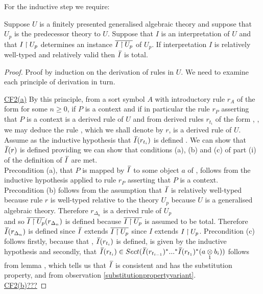 For the inductive step we require:
\begin{lemma}
Suppose $U$ is a finitely presented generalised algebraic theory and 
suppose that $U_p$ is the predecessor theory to $U$. Suppose that $I$ is an interpretation of $U$  and that  $I \mathbin{\restriction} U_p$  
determines an instance $\overline{I \mathbin{\restriction} U_p}$ of $U_p$.
If interpretation $I$ is relatively well-typed and relatively valid then $\Ibar$ is total.
\end{lemma}
\begin{proof} 
Proof by induction on the derivation of rules in $U$. We need to examine each principle of derivation in turn.

\underline{CF2(a)}
By this principle, from a sort symbol $A$ with introductory rule $r_A$ of the form  for some $n \geq 0$, if
$P$ is a context and if in particular the rule $r_P$ asserting that $P$ is a context is a derived rule of $U$
and from derived rules $r_{t_i}$ of the form , \foreachi, we may deduce
the rule , which we shall denote by $r$, is a derived rule of $U$. \\

\noindent Assume as the inductive hypothesis that $\Ibar(r_{t_i})$ is defined \foreachi. We can show that $\Ibar(r)$ is defined providing we can show that conditions (a), (b) and (c) of part (i) of the definition of $\Ibar$ are met. \\
\noindent Precondition (a), that $P$ is mapped by $\Ibar$ to some object $a$ of \catc, follows from the inductive hypothesis applied to  rule $r_P$ asserting that $P$ is a context.  \\
\noindent Precondition (b) follows from the assumption that $\Ibar$ is relatively well-typed because rule $r$ is well-typed relative to the theory
$U_p$ because $U$ is a generalised algebraic theory. 
\noindent Therefore $r_{\Delta_n}$ is a derived rule of $U_p$\\ and so $\overline{I \mathbin{\restriction} U_p}(r_{\Delta_n})$ is defined  because $\overline{I \mathbin{\restriction} U_p}$ is assumed to be total. 
Therefore $\Ibar(r_{\Delta_n})$ is defined since
$\Ibar$ extends $\overline{I \mathbin{\restriction} U_p}$ since $I$ extends $I \mathbin{\restriction} U_p$. 
\noindent  Precondition (c) follows firstly, because that \foreachi, $\Ibar(r_{t_i})$ is defined, is given by the inductive hypothesis and 
secondly, that $\Ibar(r_{t_i}) \in Sect(\Ibar(r_{t_{i-1}})^*...^*\Ibar(r_{t_{1}})^*(\crossx{a}{b_i}{1}))$ follows  from lemma , 
which tells us that $\Ibar$ is consistent and has the substitution property, and from observation \ref{substitutionpropertyvariant}.\\
\underline{CF2(b)???}
\end{proof}
